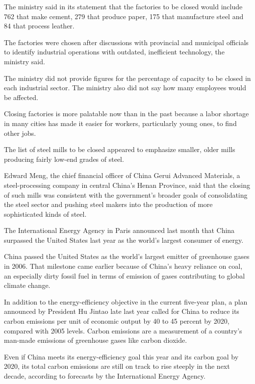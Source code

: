 ﻿\documentclass[12pt]{article}
\begin{document}
The ministry said in its statement that the factories to be closed would include 762 that make
cement, 279 that produce paper, 175 that manufacture steel and 84 that process leather.

The factories were chosen after discussions with provincial and municipal officials to identify
industrial operations with outdated, inefficient technology, the ministry said.

The ministry did not provide figures for the percentage of capacity to be closed in each industrial
sector. The ministry also did not say how many employees would be affected.

Closing factories is more palatable now than in the past because a labor shortage in many cities has
made it easier for workers, particularly young ones, to find other jobs.

The list of steel mills to be closed appeared to emphasize smaller, older mills producing fairly
low-end grades of steel.

Edward Meng, the chief financial officer of China Gerui Advanced Materials, a steel-processing
company in central China's Henan Province, said that the closing of such mills was consistent with
the government's broader goals of consolidating the steel sector and pushing steel makers into the
production of more sophisticated kinds of steel.

The International Energy Agency in Paris announced last month that China surpassed the United States
last year as the world's largest consumer of energy.

China passed the United States as the world's largest emitter of greenhouse gases in 2006. That
milestone came earlier because of China's heavy reliance on coal, an especially dirty fossil fuel in
terms of emission of gases contributing to global climate change.

In addition to the energy-efficiency objective in the current five-year plan, a plan announced by
President Hu Jintao late last year called for China to reduce its carbon emissions per unit of
economic output by 40 to 45 percent by 2020, compared with 2005 levels. Carbon emissions are a
measurement of a country's man-made emissions of greenhouse gases like carbon dioxide.

Even if China meets its energy-efficiency goal this year and its carbon goal by 2020, its total
carbon emissions are still on track to rise steeply in the next decade, according to forecasts by
the International Energy Agency.
\end{document}

